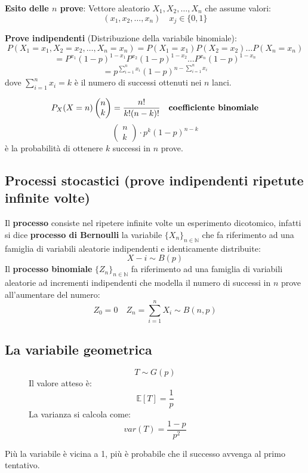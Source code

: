 \documentclass[a4paper]{article}
\theoremstyle{break}
\theoremstyle{break}
\theoremstyle{break}
\theoremstyle{break}
\begin{document}
\vspace{1em}
\noindent \textbf{Esito delle \( n \) prove}: Vettore aleatorio \( X_1, X_2, \ldots, X_n \) che
assume valori:
\[
  (x_1, x_2, \ldots, x_n) \quad x_j \in \{0,1\}
\] 

\vspace{1em}
\noindent \textbf{Prove indipendenti} (Distribuzione della variabile binomiale):
\[
P(X_1 = x_1, X_2 = x_2, \ldots, X_n = x_n) = P(X_1 = x_1)P(X_2 = x_2) \ldots P(X_n = x_n)
\] 
\[
= P^{x_1}(1-p)^{1-x_1}P^{x_2}(1-p)^{1-x_2} \ldots P^{x_n}(1-p)^{1-x_n}
\] 
\[
= p^{\sum_{i=1}^n x_i}(1-p)^{n - \sum_{i=1}^n x_i}
\] 
dove \( \sum_{i=1}^n x_i = k \) è il numero di successi ottenuti nei \( n \) lanci.

\[
P_X(X=n)\begin{pmatrix} n \\ k \end{pmatrix} = \frac{n!}{k!(n-k)!} \quad \text{\textbf{coefficiente
binomiale}}
\] 
\[ \begin{pmatrix} n \\ k \end{pmatrix} \cdot p^k(1-p)^{n-k} \] è la probabilità di ottenere
\( k \) successi in \( n \) prove.

\subsection{Processi stocastici (prove indipendenti ripetute infinite volte)}
Il \textbf{processo} consiste nel ripetere infinite volte un esperimento dicotomico,
infatti si dice \textbf{processo di Bernoulli} la variabile \( \{X_n\}_{n \in \mathbb{N}}
\) che fa riferimento ad una famiglia di variabili aleatorie indipendenti e identicamente
distribuite:
\[
X-i \sim B(p)
\] 
Il \textbf{processo binomiale} \( \{Z_n\}_{n \in \mathbb{N}}  \) fa riferimento ad una
famiglia di variabili aleatorie ad incrementi indipendenti che modella il numero di 
successi in \( n \) prove all'aumentare del numero:
\[
Z_0 = 0 \quad Z_n = \sum_{i=1}^n X_i \sim B(n,p)
\] 

\subsection{La variabile geometrica}
\begin{figure}[H]
  \begin{definition}
    \[
      T \sim G(p)
    \] 
    Il valore atteso è:
    \[
      \mathbb{E}[T] = \frac{1}{p}
    \] 
    La varianza si calcola come:
    \[
    var(T) = \frac{1-p}{p^2}
    \] 
  \end{definition}
\end{figure}
Più la variabile è vicina a 1, più è probabile che il successo avvenga al primo tentativo.
\end{document}
